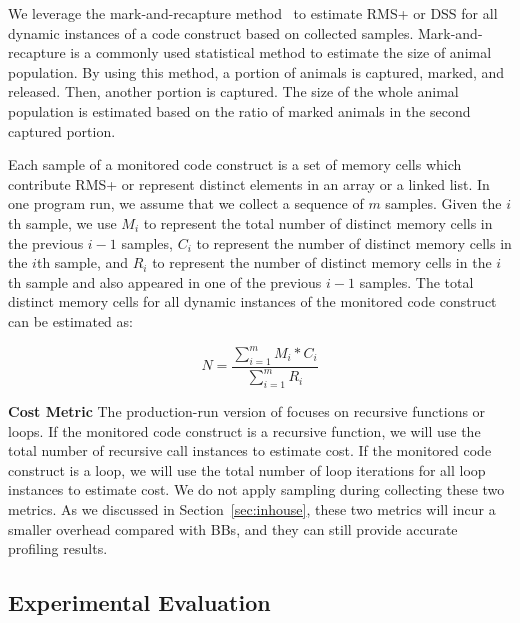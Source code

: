 We leverage the mark-and-recapture method~\citep{mark-recapture} to 
estimate RMS+ or DSS for all dynamic instances of a code construct 
based on collected samples. 
Mark-and-recapture is a commonly used statistical method 
to estimate the size of animal population. 
By using this method, a portion of animals is captured, marked, and released. 
Then, another portion is captured.
The size of the whole animal population is estimated 
based on the ratio of marked animals in the second captured portion.  


Each sample of a monitored code construct is a set of memory cells 
which contribute RMS+ or represent distinct elements in an array or a linked list. 
In one program run, we assume that we collect a sequence of $m$ samples. 
Given the $i$th sample, we use $M_i$ to represent the 
total number of distinct memory cells in the previous $i-1$ samples, 
$C_i$ to represent the number of distinct memory cells in the $i$th sample,
and $R_i$ to represent the number of distinct memory cells in 
the $i$th sample and also appeared in one of the previous $i-1$ samples.
The total distinct memory cells for all dynamic instances 
of the monitored code construct can be estimated as:


\begin{equation} \label{eq:mark}
N = \frac{\sum\limits_{i=1}^m M_i*C_i}{\sum\limits_{i=1}^m R_i}
\end{equation}

\noindent\textbf{Cost Metric}
The production-run version of \Tool focuses on recursive functions or loops.
If the monitored code construct is a recursive function,
we will use the total number of recursive call instances to estimate cost.
If the monitored code construct is a loop, 
we will use the total number of loop iterations for all loop instances to estimate cost. 
We do not apply sampling during collecting these two metrics. 
As we discussed in Section~\ref{sec:inhouse},
these two metrics will incur a smaller overhead compared with BBs, 
and they can still provide accurate profiling results.  


\subsection{Experimental Evaluation}

